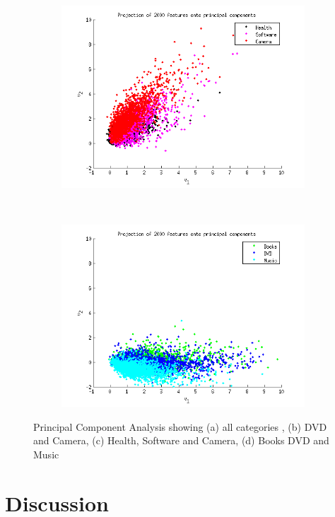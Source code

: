 \begin{figure}[h!btcp]
\begin{subfigure}[b]{0.5\linewidth}
                               \caption{}
        \end{subfigure}
	    \begin{subfigure}[b]{0.5\textwidth}
	            \centering
	            \includegraphics[width=\linewidth]{../Plottar/pca_largecorr.png}
	                           \caption{}
	    \end{subfigure}%
	    ~ %
	    \begin{subfigure}[b]{0.5\textwidth}
	            \centering
	            \includegraphics[width=\textwidth]{../Plottar/pca_somecorr.png} 
              \caption{}
	    \end{subfigure}
	    \caption{Principal Component Analysis showing (a) all categories , (b) DVD and Camera, (c) Health, Software and Camera, (d) Books DVD and Music}
                
\end{figure}


\section{Discussion}

